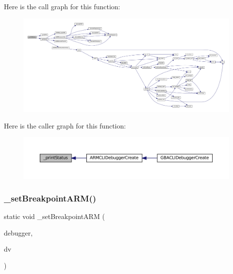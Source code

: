 Here is the call graph for this function\+:
\nopagebreak
\begin{figure}[H]
\begin{center}
\leavevmode
\includegraphics[width=350pt]{arm_2debugger_2cli-debugger_8c_a1bce4490785068fd42fca65db1fb21ad_cgraph}
\end{center}
\end{figure}
Here is the caller graph for this function\+:
\nopagebreak
\begin{figure}[H]
\begin{center}
\leavevmode
\includegraphics[width=350pt]{arm_2debugger_2cli-debugger_8c_a1bce4490785068fd42fca65db1fb21ad_icgraph}
\end{center}
\end{figure}
\mbox{\label{arm_2debugger_2cli-debugger_8c_ae37b285f8c652414bf1f0aafa2d4909b}} 
\subsubsection{\texorpdfstring{\+\_\+set\+Breakpoint\+A\+R\+M()}{\_setBreakpointARM()}}
{\footnotesize\ttfamily static void \+\_\+set\+Breakpoint\+A\+RM (\begin{DoxyParamCaption}\item[{struct C\+L\+I\+Debugger $\ast$}]{debugger,  }\item[{struct C\+L\+I\+Debug\+Vector $\ast$}]{dv }\end{DoxyParamCaption})\hspace{0.3cm}{\ttfamily [static]}}


